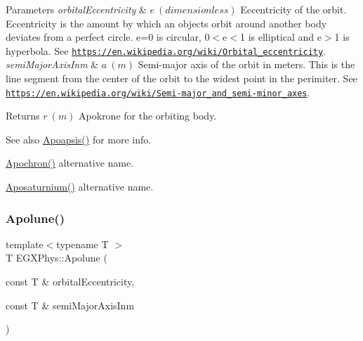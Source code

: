 \begin{DoxyParams}{Parameters}
{\em orbital\+Eccentricity} & $ e\ (dimensionless)$ Eccentricity of the orbit. Eccentricity is the amount by which an objects orbit around another body deviates from a perfect circle. e=0 is circular, 0$<$e$<$1 is elliptical and e$>$1 is hyperbola. See \href{https://en.wikipedia.org/wiki/Orbital_eccentricity}{\tt https\+://en.\+wikipedia.\+org/wiki/\+Orbital\+\_\+eccentricity}. \\
\hline
{\em semi\+Major\+Axis\+Inm} & $ a\ (m)$ Semi-\/major axis of the orbit in meters. This is the line segment from the center of the orbit to the widest point in the perimiter. See \href{https://en.wikipedia.org/wiki/Semi-major_and_semi-minor_axes}{\tt https\+://en.\+wikipedia.\+org/wiki/\+Semi-\/major\+\_\+and\+\_\+semi-\/minor\+\_\+axes}. \\
\hline
\end{DoxyParams}
\begin{DoxyReturn}{Returns}
$ r\ (m)$ Apokrone for the orbiting body. 
\end{DoxyReturn}
\begin{DoxySeeAlso}{See also}
\mbox{\hyperlink{group___e_g_x_phys-_apoapsis_gafd08a2d1d64886e7bb9bcb7ff65bc3ea}{Apoapsis()}} for more info. 

\mbox{\hyperlink{group___e_g_x_phys-_apoapsis_gac978de20a08121198f73637018c80eee}{Apochron()}} alternative name. 

\mbox{\hyperlink{group___e_g_x_phys-_apoapsis_gabb69067baa611c8bda701d7040cc47b6}{Aposaturnium()}} alternative name. 
\end{DoxySeeAlso}
\mbox{\label{group___e_g_x_phys-_apoapsis_gac82e5aebcf63e5113ddefe648f40ef2e}} 
\subsubsection{\texorpdfstring{Apolune()}{Apolune()}}
{\footnotesize\ttfamily template$<$typename T $>$ \\
T E\+G\+X\+Phys\+::\+Apolune (\begin{DoxyParamCaption}\item[{const T \&}]{orbital\+Eccentricity,  }\item[{const T \&}]{semi\+Major\+Axis\+Inm }\end{DoxyParamCaption})}



